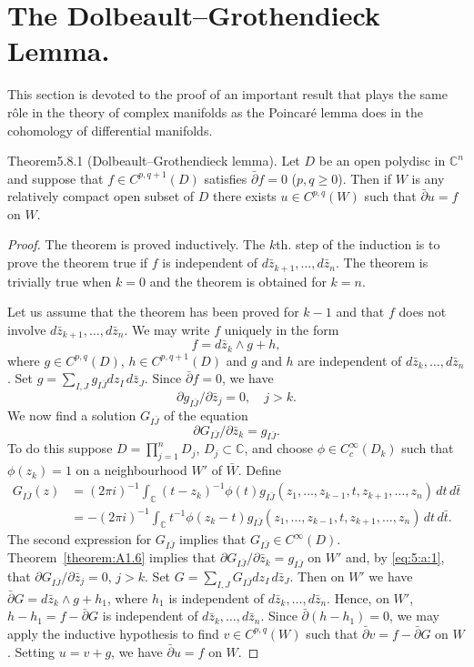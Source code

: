 \section{The Dolbeault--Grothendieck Lemma.}\label{sec:5:8}
This section is devoted to the proof of an important result that plays the same r\^ole in the theory of complex manifolds as the Poincar\'e lemma does in the cohomology of differential manifolds.
\begin{originaltheorem}{Theorem}{5.8.1}
(Dolbeault--Grothendieck lemma). Let $D$ be an open polydisc in $\mathbb C^n$ and suppose that $f\in C^{p,q+1}(D)$ satisfies $\bar\partial f=0$ ($p,q\geq0$). Then if $W$ is any relatively compact open subset of $D$ there exists $u\in C^{p,q}(W)$ such that $\bar\partial u=f$ on $W$.
\end{originaltheorem}
\begin{proof}
The theorem is proved inductively. The $k$th. step of the induction is to prove the theorem true if $f$ is independent of $d\bar z_{k+1},\ldots,d\bar z_n$. The theorem is trivially true when $k=0$ and the theorem is obtained for $k=n$.

Let us assume that the theorem has been proved for $k-1$ and that $f$ does not involve $d\bar z_{k+1},\ldots,d\bar z_n$. We may write $f$ uniquely in the form
\[f=d\bar z_k\wedge g+h,\]
where $g\in C^{p,q}(D)$, $h\in C^{p,q+1}(D)$ and $g$ and $h$ are independent of $d\bar z_k,\ldots,d\bar z_n$. Set $g=\sum_{I,J}g_{I\bar J}dz_I\,d\bar z_J$. Since $\bar\partial f=0$, we have
\[\partial g_{I\bar J}/\partial\bar z_j=0,\quad j>k.\tag{A}\label{eq:5:a:1}\]
We now find a solution $G_{I\bar J}$ of the equation
\[\partial G_{I\bar J}/\partial\bar z_k=g_{I\bar J}.\]
To do this suppose $D=\prod_{j=1}^nD_j$, $D_j\subset\mathbb C$, and choose $\phi\in C_c^\infty(D_k)$ such that $\phi(z_k)=1$ on a neighbourhood $W'$ of $\bar W$. Define
\[
\begin{split}
G_{I\bar J}(z)&=(2\pi i)^{-1}\int_{\mathbb C}(t-z_k)^{-1}\phi(t)g_{I\bar J}(z_1,\ldots,z_{k-1},t,z_{k+1},\ldots,z_n)\,dt\,d\bar t\\
&=-(2\pi i)^{-1}\int_{\mathbb C}t^{-1}\phi(z_k-t)g_{I\bar J}(z_1,\ldots,z_{k-1},t,z_{k+1},\ldots,z_n)\,dt\,d\bar t.
\end{split}
\]
The second expression for $G_{I\bar J}$ implies that $G_{I\bar J}\in C^\infty(D)$. Theorem~\ref{theorem:A1.6} implies that $\partial G_{I\bar J}/\partial\bar z_k=g_{I\bar J}$ on $W'$ and, by \eqref{eq:5:a:1}, that $\partial G_{I\bar J}/\partial\bar z_j=0$, $j>k$. Set $G=\sum_{I,J}G_{I\bar J}dz_I\,d\bar z_J$. Then on $W'$ we have $\bar\partial G=d\bar z_k\wedge g+h_1$, where $h_1$ is independent of $d\bar z_k,\ldots,d\bar z_n$. Hence, on $W'$, $h-h_1=f-\bar\partial G$ is independent of $d\bar z_k,\ldots,d\bar z_n$. Since $\bar\partial(h-h_1)=0$, we may apply the inductive hypothesis to find $v\in C^{p,q}(W)$ such that $\bar\partial v=f-\bar\partial G$ on $W$. Setting $u=v+g$, we have $\bar\partial u=f$ on $W$.
\end{proof}
